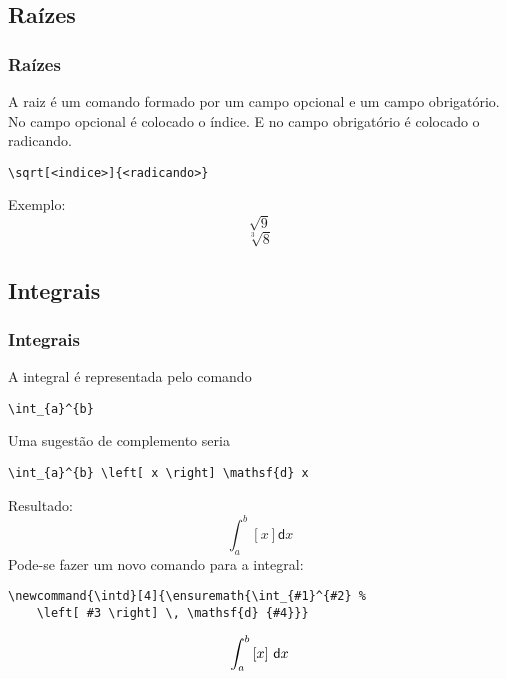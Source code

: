 \documentclass[brazilian]{beamer}
\begin{document}
\subsection{Raízes}
\begin{frame}[fragile]
    \frametitle{Raízes}

A raiz é um comando formado por um campo opcional e um campo obrigatório. No campo opcional é colocado o índice. E no campo obrigatório é colocado o radicando. 
\begin{lstlisting}[style=myStyleLatex]
\sqrt[<indice>]{<radicando>}
\end{lstlisting}
Exemplo: \[\sqrt{9}\]\[\sqrt[3]{8}\]

\end{frame}

\subsection{Integrais}
\begin{frame}[fragile]
    \frametitle{Integrais}

A integral é representada pelo comando
\begin{lstlisting}[style=myStyleLatex]
\int_{a}^{b} 
\end{lstlisting}
Uma sugestão de complemento seria
\begin{lstlisting}[style=myStyleLatex]
\int_{a}^{b} \left[ x \right] \mathsf{d} x 
\end{lstlisting}
Resultado: \[\int_{a}^{b} \left[ x \right] \mathsf{d} x \]
Pode-se fazer um novo comando para a integral:
\begin{lstlisting}[style=myStyleLatex,]
\newcommand{\intd}[4]{\ensuremath{\int_{#1}^{#2} % 
    \left[ #3 \right] \, \mathsf{d} {#4}}}     
\end{lstlisting}
\[\intd{a}{b}{x}{x}\]
\end{frame}
\end{document}
